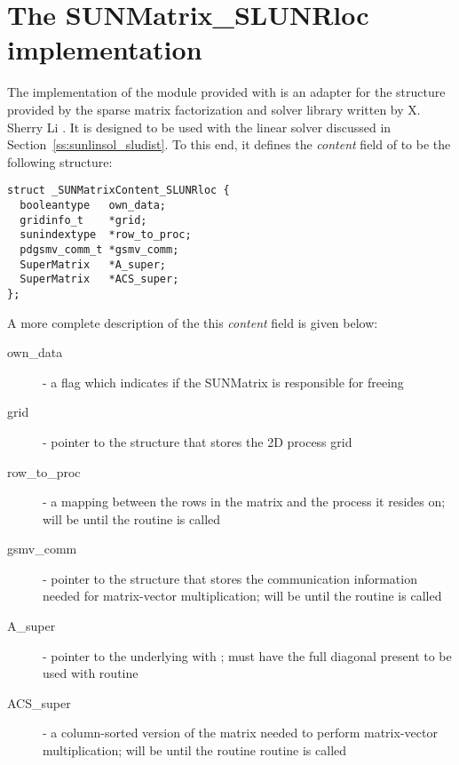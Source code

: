 \section{The SUNMatrix\_SLUNRloc implementation}\label{ss:sunmat_slunrloc}

The {\sunmatslunrloc} implementation of the {\sunmatrix} module provided with
{\sundials} is an adapter for the  structure provided by the
{\superludist} sparse matrix factorization and solver library written by
X. Sherry Li \cite{SuperLUDIST_site,GDL:07,LD:03,SLUUG:99}.
It is designed to be used with the {\sunlinsolsludist} linear solver
discussed in Section~\ref{ss:sunlinsol_sludist}. To this end, it defines the
{\em content} field of  to be the following structure:
\begin{verbatim}
struct _SUNMatrixContent_SLUNRloc {
  booleantype   own_data;
  gridinfo_t    *grid;
  sunindextype  *row_to_proc;
  pdgsmv_comm_t *gsmv_comm;
  SuperMatrix   *A_super;
  SuperMatrix   *ACS_super;
};
\end{verbatim}

A more complete description of the this \emph{content} field is given below:

\begin{description}
  \item[own\_data] - a flag which indicates if the SUNMatrix is responsible for freeing
  \item[grid] - pointer to the {\superludist} structure that stores the 2D process grid
  \item[row\_to\_proc] - a mapping between the rows in the matrix and the process it
    resides on; will be  until the  routine is called
  \item[gsmv\_comm] - pointer to the {\superludist} structure that stores the
    communication information needed for matrix-vector multiplication; will be
     until the  routine is called
  \item[A\_super] - pointer to the underlying {\superludist}  with
      ; must have the
      full diagonal present to be used with  routine
  \item[ACS\_super] - a column-sorted version of the matrix needed to perform matrix-vector
    multiplication; will be  until the routine 
    routine is called
\end{description}

